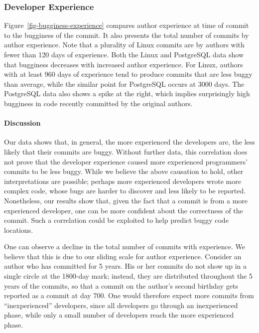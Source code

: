 \subsubsection{Developer Experience}
\label{sec-dev-exp}

Figure~\ref{fig-bugginess-experience} compares author experience at time of
commit to the bugginess of the commit. It also presents the total number of
commits by author experience. Note that a plurality of Linux commits are by
authors with fewer than 120 days of experience. Both the Linux and PostgreSQL
data show that bugginess decreases with increased author experience. For Linux,
authors with at least 960 days of experience tend to produce commits that are
less buggy than average, while the similar point for PostgreSQL occurs at 3000
days. The PostgreSQL data also shows a spike at the right, which implies
surprisingly high bugginess in code recently committed by the original authors.

\paragraph{Discussion}

Our data shows that, in general, the more experienced the developers are, the
less likely that their commits are buggy. Without further data, this
correlation does not prove that the developer experience caused more experienced
programmers' commits to be less buggy. While we believe the above causation to
hold, other interpretations are possible; perhaps more experienced developers
wrote more complex code, whose bugs are harder to discover and less likely to be
reported. Nonetheless, our results show that, given the fact that a commit is
from a more experienced developer, one can be more confident about the
correctness of the commit. Such a correlation could be exploited to help predict
buggy code locations.

One can observe a decline in the total number of commits with experience.
We believe that this is due to our sliding scale for author experience.
Consider an author who has committed for 5 years. His or her commits do not
show up in a single circle at the 1800-day mark; instead, they are distributed
throughout the 5 years of the commits, so that a commit on the author's second
birthday gets reported as a commit at day 700. One would therefore expect
more commits from ``inexperienced'' developers, since all developers go through
an inexperienced phase, while only a small number of developers reach the
more experienced phase.

